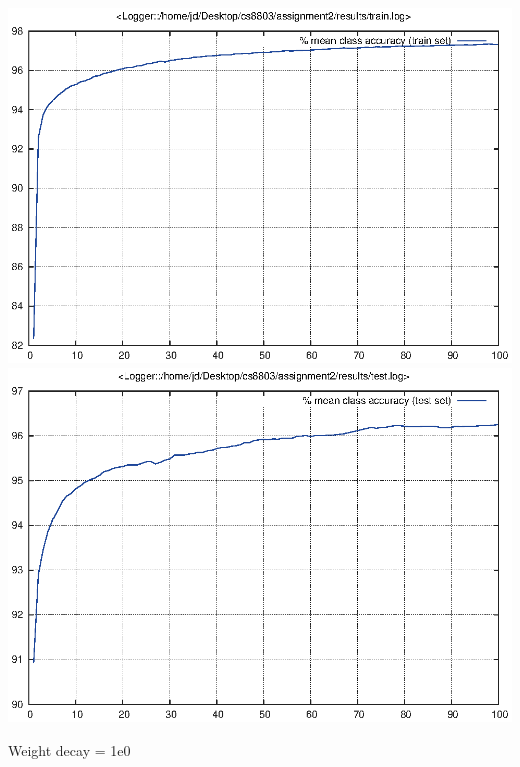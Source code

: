 \documentclass[twoside,12pt]{article}
\newcommand{\imsize}{0.5\linewidth}
\begin{document}
\includegraphics[width=\imsize]{assignment2/results/sgdw_train}
\includegraphics[width=\imsize]{assignment2/results/sgdw_test}

Weight decay = 1e0
\end{document}
